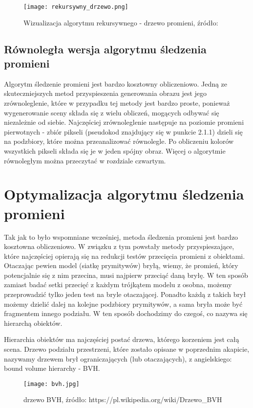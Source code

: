 \begin{figure}[H]
\centering
  \texttt{[image: rekursywny\_drzewo.png]}
  \caption{Wizualizacja algorytmu rekursywnego - drzewo promieni, źródło: \cite{scratch}}
\end{figure}


\subsection{Równoległa wersja algorytmu śledzenia promieni}

Algorytm śledzenie promieni jest bardzo kosztowny obliczeniowo. Jedną ze skuteczniejszych metod przyspieszenia generowania obrazu jest jego zrównoleglenie, które w przypadku tej metody jest bardzo proste, ponieważ wygenerowanie sceny składa się z wielu obliczeń, mogących odbywać się niezależnie od siebie. Najczęściej zrównoleglenie następuje na poziomie promieni pierwotnych - zbiór pikseli (pseudokod znajdujący się w punkcie 2.1.1) dzieli się na podzbiory, które można przeanalizować równolegle. Po obliczeniu kolorów wszystkich pikseli składa się je w jeden spójny obraz. Więcej o algorytmie równoległym można przeczytać w rozdziale czwartym.

\section{Optymalizacja algorytmu śledzenia promieni}

Tak jak to było wspomniane wcześniej, metoda śledzenia promieni jest bardzo kosztowna obliczeniowo. W związku z tym powstały metody przyspieszające, które najczęściej opierają się na redukcji testów przecięcia promieni z obiektami. Otaczając pewien model (siatkę prymitywów) bryłą, wiemy, że promień, który potencjalnie się z nim przecina, musi najpierw przeciąć daną bryłę. W ten sposób zamiast badać setki przecięć z każdym trójkątem modelu z osobna, możemy przeprowadzić tylko jeden test na bryle otaczającej. Ponadto każdą z takich brył możemy dzielić dalej na kolejne podzbiory prymitywów, a sama bryła może być fragmentem innego podziału. W ten sposób dochodzimy do czegoś, co nazywa się hierarchą obiektów.

Hierarchia obiektów ma najczęściej postać drzewa, którego korzeniem jest całą scena. Drzewo podziału przestrzeni, które zostało opisane w poprzednim akapicie, nazywamy drzewem brył ograniczających (lub otaczających), z angielskiego: bound volume hierarchy - BVH. 

\begin{figure}[H]
\centering
  \texttt{[image: bvh.jpg]}
  \caption{drzewo BVH, źródło: https://pl.wikipedia.org/wiki/Drzewo\_BVH}
\end{figure}

